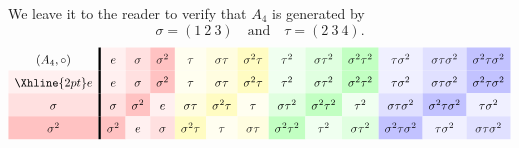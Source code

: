 \documentclass{ximera}
\begin{document}
\begin{example}
  We leave it to the reader to verify that $A_4$ is generated by
  \[
  \sigma=(1\ 2\ 3)\quad \text{and}\quad \tau = (2\ 3\ 4).
  \]
  \begin{gather*}
    \renewcommand{\arraystretch}{1.6}
      \begin{array}{c!{\vline width 2pt}cccccccccccc}
      (A_{4},\circ)& e\cellcolor{red!6!white}     & \sigma\cellcolor{red!12!white}     & \sigma^2\cellcolor{red!24!white}   & \tau \cellcolor{yellow!6!white}    & \sigma\tau \cellcolor{yellow!12!white}  & \sigma^2 \tau\cellcolor{yellow!24!white} & \tau^2\cellcolor{green!6!white}    &  \sigma \tau^2\cellcolor{green!12!white}  &  \sigma^2 \tau^2\cellcolor{green!24!white} & \tau\sigma^2 \cellcolor{blue!6!white} & \sigma\tau\sigma^2 \cellcolor{blue!12!white}& \sigma^2 \tau \sigma^2\cellcolor{blue!24!white}\\  \Xhline{2pt}
      e \cellcolor{red!6!white}         & e\cellcolor{red!6!white}         & \sigma\cellcolor{red!12!white}           & \sigma^2\cellcolor{red!24!white}   & \tau \cellcolor{yellow!6!white}    & \sigma\tau \cellcolor{yellow!12!white}  & \sigma^2 \tau\cellcolor{yellow!24!white} & \tau^2\cellcolor{green!6!white}    &  \sigma \tau^2\cellcolor{green!12!white}  &  \sigma^2 \tau^2\cellcolor{green!24!white} & \tau\sigma^2 \cellcolor{blue!6!white} & \sigma\tau\sigma^2 \cellcolor{blue!12!white}& \sigma^2 \tau \sigma^2\cellcolor{blue!24!white}\\ 
      \sigma\cellcolor{red!12!white}         & \sigma\cellcolor{red!12!white}        & \sigma^2\cellcolor{red!24!white}            & e\cellcolor{red!6!white}     & \sigma\tau\cellcolor{yellow!12!white} & \sigma^2\tau \cellcolor{yellow!24!white}    & \tau \cellcolor{yellow!6!white}   & \sigma\tau^2 \cellcolor{green!12!white}  & \sigma^2\tau^2 \cellcolor{green!24!white} & \tau^2 \cellcolor{green!6!white} & \sigma \tau\sigma^2 \cellcolor{blue!12!white} & \sigma^2 \tau\sigma^2 \cellcolor{blue!24!white} & \tau\sigma^2 \cellcolor{blue!6!white}\\  
      \sigma^2\cellcolor{red!24!white}       & \sigma^2\cellcolor{red!24!white}      & e\cellcolor{red!6!white}           & \sigma\cellcolor{red!12!white}    & \sigma^2 \tau \cellcolor{yellow!24!white}   & \tau \cellcolor{yellow!6!white} & \sigma\tau \cellcolor{yellow!12!white}   &  \sigma^2\tau^2 \cellcolor{green!24!white}  & \tau^2 \cellcolor{green!6!white} & \sigma\tau^2\cellcolor{green!12!white}  & \sigma^2\tau\sigma^2\cellcolor{blue!24!white} & \tau\sigma^2\cellcolor{blue!6!white} & \sigma\tau\sigma^2\cellcolor{blue!12!white}\\  

\end{array}
\end{gather*}
\end{example}
\end{document}
